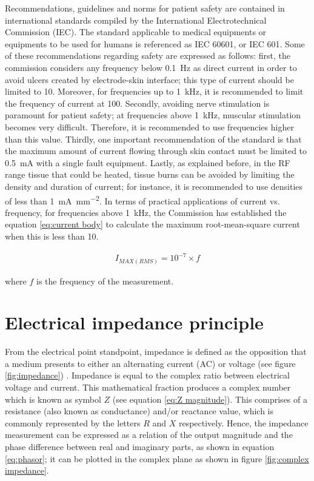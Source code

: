Recommendations, guidelines and norms for patient safety are contained in international standards compiled by the International Electrotechnical Commission (IEC). The standard applicable to medical equipments or equipments to be used for humans is referenced as IEC 60601, or IEC 601. Some of these recommendations regarding safety are expressed as follows: first, the commission considers any frequency below \SI{0.1}{\hertz} as direct current in order to avoid ulcers created by electrode-skin interface; this type of current should be limited to \SI{10}{\uArms}. Moreover, for frequencies up to \SI{1}{\kilo\hertz}, it is recommended to limit the frequency of current at \SI{100}{\uArms}. Secondly, avoiding nerve stimulation is paramount for patient safety; at frequencies above \SI{1}{\kilo\hertz}, muscular stimulation becomes very difficult. Therefore, it is recommended to use frequencies higher than this value. Thirdly, one important recommendation of the standard is that the maximum amount of current flowing through skin contact must be limited to \SI{0.5}{\milli\ampere} with a single fault equipment. Lastly, as explained before, in the RF range tissue that could be heated, tissue burns can be avoided by limiting the density and duration of current; for instance, it is recommended to use densities of less than \SI{1}{\milli\ampere\per\milli\meter\squared}. In terms of practical applications of current vs. frequency, for frequencies above \SI{1}{\kilo\hertz}, the Commission has established the equation \ref{eq:current body} to calculate the maximum root-mean-square current when this is less than \SI{10}{\mArms}.

\begin{align}
	\label{eq:current body}
	I_{MAX(RMS)} = 10^{-7} \times f
\end{align}

where $f$ is the frequency of the measurement.

\section{Electrical impedance principle}
\label{section impedance principle}
From the electrical point standpoint, impedance is defined as the opposition that a medium presents to either an alternating current (AC) or voltage (see figure \ref{fig:impedance}) \cite{callegaro2012electrical}. Impedance is equal to the complex ratio between electrical voltage and current. This mathematical fraction produces a complex number which is known as symbol $Z$ (see equation \ref{eq:Z magnitude}). This comprises of a resistance (also known as conductance) and/or reactance value, which is commonly represented by the letters $R$ and $X$ respectively. Hence, the impedance measurement can be expressed as a relation of the output magnitude and the phase difference between real and imaginary parts, as shown in equation \ref{eq:phasor}; it can be plotted in the complex plane as shown in figure \ref{fig:complex impedance}.

